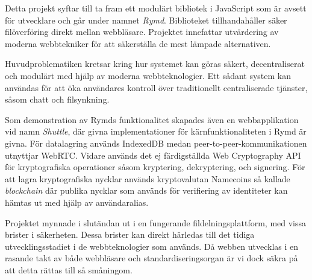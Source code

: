 Detta projekt syftar till ta fram ett modulärt bibliotek i JavaScript som är avsett för utvecklare och går under namnet \emph{Rymd}. Biblioteket tillhandahåller säker filöverföring direkt mellan webbläsare. Projektet innefattar utvärdering av moderna webbtekniker för att säkerställa de mest lämpade alternativen.

Huvudproblematiken kretsar kring hur systemet kan göras säkert, decentraliserat och modulärt med hjälp av moderna webbteknologier. Ett sådant system kan användas för att öka användares kontroll över traditionellt centraliserade tjänster, såsom chatt och filsynkning.

Som demonstration av Rymds funktionalitet skapades även en webbapplikation vid namn \emph{Shuttle}, där givna implementationer för kärnfunktionaliteten i Rymd är givna. För datalagring används IndexedDB medan peer-to-peer-kommunikationen utnyttjar WebRTC. Vidare används det ej färdigställda Web Cryptography API för kryptografiska operationer såsom kryptering, dekryptering, och signering. För att lagra kryptografiska nycklar används kryptovalutan Namecoins så kallade \emph{blockchain} där publika nycklar som används för verifiering av identiteter kan hämtas ut med hjälp av användaralias.

Projektet mynnade i slutändan ut i en fungerande fildelningsplattform, med vissa brister i säkerheten. Dessa brister kan direkt härledas till det tidiga utvecklingsstadiet i de webbteknologier som används. Då webben utvecklas i en rasande takt av både webbläsare och standardiseringsorgan är vi dock säkra på att detta rättas till så småningom.
